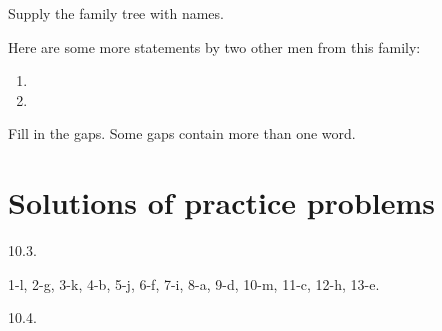 \begin{refsection}
\begin{problem}{\langnameAkan}{\nameKGilyarova}{}
\begin{assgts}
\item Supply the family tree with names.
\item Here are some more statements by two other men from this family:
\begin{enumerate}[start = 4]\sloppy
    \item {}
    \item {}
\end{enumerate}
\item[] Fill in the gaps. Some gaps contain more than one word.
\end{assgts}
\end{problem}

\hypertarget{solutions-of-practice-problems}{%
\section{Solutions of practice problems}}

\begin{practiceproblemsolution}{10.3. \langnameBardi}

\begin{solutions}[label=Solution 10.3\alph*]
    \item 1-l, 2-g, 3-k, 4-b, 5-j, 6-f, 7-i, 8-a, 9-d, 10-m, 11-c, 12-h, 13-e.
\end{solutions}
\end{practiceproblemsolution}


\begin{practiceproblemsolution}{10.4. \langnameKharia}


\end{practiceproblemsolution}
\end{refsection}
